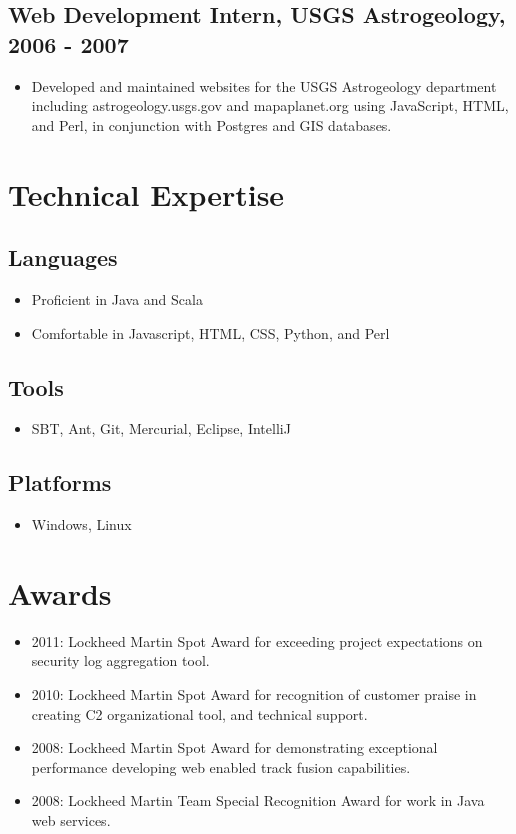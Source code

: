 \documentclass[11pt]{article}
\begin{document}
\subsection*{Web Development Intern, USGS Astrogeology, 2006 - 2007}
\label{sec-1.2}

\begin{itemize}
\item Developed and maintained websites for the USGS Astrogeology department including astrogeology.usgs.gov and mapaplanet.org using JavaScript, HTML, and Perl, in conjunction with Postgres and GIS databases.
\end{itemize}
\section*{Technical Expertise}
\label{sec-2}

\subsection*{Languages}
\label{sec-2.1}

\begin{itemize}
\item Proficient in Java and Scala
\item Comfortable in Javascript, HTML, CSS, Python, and Perl
\end{itemize}
\subsection*{Tools}
\label{sec-2.2}

\begin{itemize}
\item SBT, Ant, Git, Mercurial, Eclipse, IntelliJ
\end{itemize}
\subsection*{Platforms}
\label{sec-2.3}

\begin{itemize}
\item Windows, Linux
\end{itemize}
\section*{Awards}
\label{sec-3}

\begin{itemize}
\item 2011: Lockheed Martin Spot Award for exceeding project expectations on security log aggregation tool.
\item 2010: Lockheed Martin Spot Award for recognition of customer praise in creating C2 organizational tool, and technical support.
\item 2008: Lockheed Martin Spot Award for demonstrating exceptional performance developing web enabled track fusion capabilities.
\item 2008: Lockheed Martin Team Special Recognition Award for work in Java web services.
\end{itemize}
\end{document}
